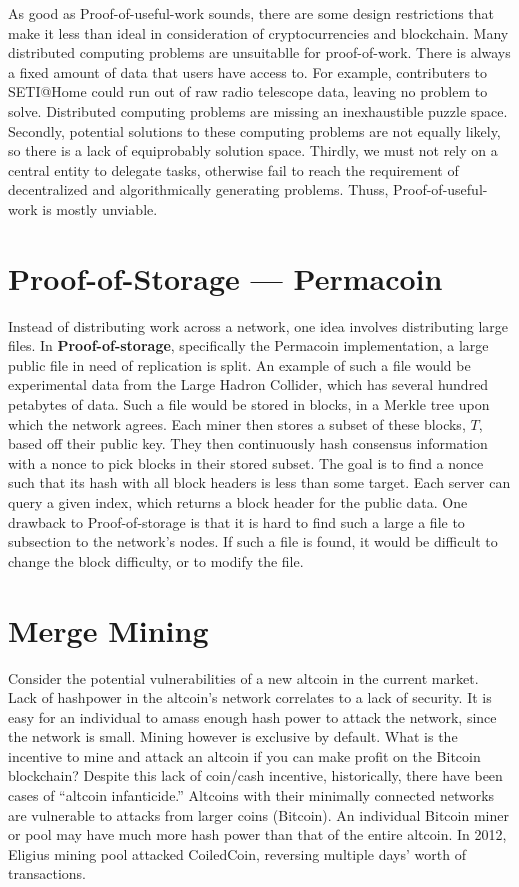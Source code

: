 \documentclass[full.tex]{subfiles}
\begin{document}
    As good as Proof-of-useful-work sounds, there are some design restrictions that make it less than ideal in consideration of cryptocurrencies and blockchain. Many distributed computing problems are unsuitablle for proof-of-work. There is always a fixed amount of data that users have access to. For example, contributers to SETI@Home could run out of raw radio telescope data, leaving no problem to solve. Distributed computing problems are missing an inexhaustible puzzle space. Secondly, potential solutions to these computing problems are not equally likely, so there is a lack of equiprobably solution space. Thirdly, we must not rely on a central entity to delegate tasks, otherwise fail to reach the requirement of decentralized and algorithmically generating problems. Thuss, Proof-of-useful-work is mostly unviable.
    
    \section*{Proof-of-Storage --- Permacoin}
    
    Instead of distributing work across a network, one idea involves distributing large files. In \textbf{Proof-of-storage}, specifically the Permacoin implementation, a large public file in need of replication is split. An example of such a file would be experimental data from the Large Hadron Collider, which has several hundred petabytes of data. Such a file would be stored in blocks, in a Merkle tree upon which the network agrees. Each miner then stores a subset of these blocks, $T$, based off their public key. They then continuously hash consensus information with a nonce to pick blocks in their stored subset. The goal is to find a nonce such that its hash with all block headers is less than some target. Each server can query a given index, which returns a block header for the public data. One drawback to Proof-of-storage is that it is hard to find such a large a file to subsection to the network's nodes. If such a file is found, it would be difficult to change the block difficulty, or to modify the file.
    
    \section*{Merge Mining}
    
    Consider the potential vulnerabilities of a new altcoin in the current market. Lack of hashpower in the altcoin's network correlates to a lack of security. It is easy for an individual to amass enough hash power to attack the network, since the network is small. Mining however is exclusive by default. What is the incentive to mine and attack an altcoin if you can make profit on the Bitcoin blockchain? Despite this lack of coin/cash incentive, historically, there have been cases of ``altcoin infanticide.'' Altcoins with their minimally connected networks are vulnerable to attacks from larger coins (Bitcoin). An individual Bitcoin miner or pool may have much more hash power than that of the entire altcoin. In 2012, Eligius mining pool attacked CoiledCoin, reversing multiple days' worth of transactions.
    
\end{document}
